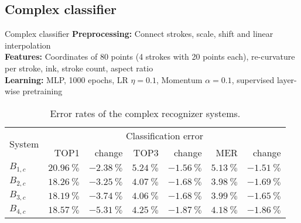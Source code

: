 \subsection{Complex classifier}
\begin{frame}{Complex classifier}
    \textbf{Preprocessing:} Connect strokes, scale, shift and linear interpolation\\
    \textbf{Features:} Coordinates of 80 points (4 strokes with 20 points each), re-curvature per stroke, ink, stroke count, aspect ratio\\
    \textbf{Learning:} MLP, 1000 epochs, LR $\eta=0.1$, Momentum $\alpha=0.1$, supervised layer-wise pretraining
\begin{table}[htb]
    \centering
    \begin{tabular}{lrrrrrr}
    \toprule
    \multirow{2}{*}{System}  & \multicolumn{6}{c}{Classification error}\\
    \cmidrule(l){2-7}
              & TOP1                   & change                 & TOP3                  & change                 & MER                   & change \\\midrule
    $B_{1,c}$ & $\SI{20.96}{\percent}$ & $\SI{-2.38}{\percent}$ & $\SI{5.24}{\percent}$ & $\SI{-1.56}{\percent}$ & $\SI{5.13}{\percent}$ & $\SI{-1.51}{\percent}$ \\
    $B_{2,c}$ & $\SI{18.26}{\percent}$ & $\SI{-3.25}{\percent}$ & $\SI{4.07}{\percent}$ & $\SI{-1.68}{\percent}$ & \underline{$\SI{3.98}{\percent}$} & $\SI{-1.69}{\percent}$ \\
    $B_{3,c}$ & \underline{$\SI{18.19}{\percent}$} & $\SI{-3.74}{\percent}$ & \underline{$\SI{4.06}{\percent}$} & $\SI{-1.68}{\percent}$ & $\SI{3.99}{\percent}$ & $\SI{-1.65}{\percent}$ \\
    $B_{4,c}$ & $\SI{18.57}{\percent}$ & $\SI{-5.31}{\percent}$ & $\SI{4.25}{\percent}$ & $\SI{-1.87}{\percent}$ & $\SI{4.18}{\percent}$ & $\SI{-1.86}{\percent}$ \\
    \bottomrule
    \end{tabular}
    \caption{Error rates of the complex recognizer systems.}
\label{table:complex-recognizer-systems-evaluation}
\end{table}
\end{frame}